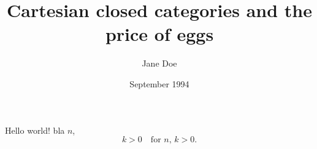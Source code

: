 \documentclass{article}
\title{Cartesian closed categories and the price of eggs}
\author{Jane Doe}
\date{September 1994}
\begin{document}
   \maketitle
   Hello world!
    bla $n$, $$k>0 \quad\text{for $n$, $k>0$.}$$
\end{document}
